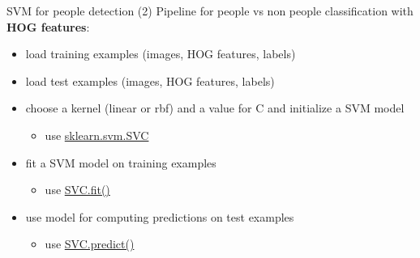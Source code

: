 \begin{frame}{SVM for people detection (2)}
Pipeline for people vs non people classification with \textbf{HOG features}:
\begin{itemize}
\item load training examples (images, HOG features, labels)
\item load test examples (images, HOG features, labels)
\item choose a kernel (linear or rbf) and a value for C and initialize a SVM model 
\begin{itemize}
\item use \href{http://scikit-learn.org/stable/modules/generated/sklearn.svm.SVC.html}{sklearn.svm.SVC}
\end{itemize}
\item fit a SVM model on training examples
\begin{itemize}
\item use \href{http://scikit-learn.org/stable/modules/generated/sklearn.svm.SVC.html\#sklearn.svm.SVC.fit}{SVC.fit()}
\end{itemize}
\item use model for computing predictions on test examples
\begin{itemize}
\item use \href{http://scikit-learn.org/stable/modules/generated/sklearn.svm.SVC.html\#sklearn.svm.SVC.predict}{SVC.predict()}
\end{itemize}
\end{itemize}
\end{frame}